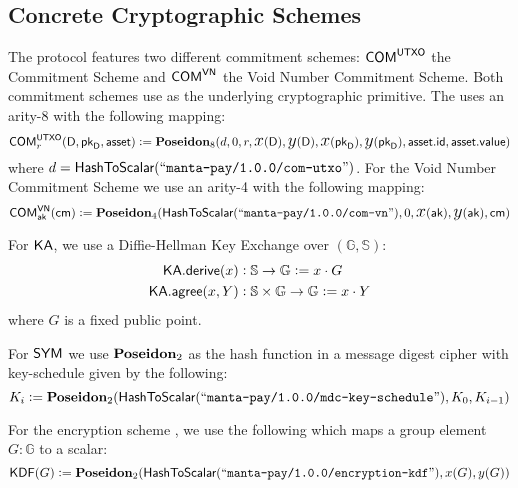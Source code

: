 \subsection{Concrete Cryptographic Schemes}

\begin{definition}
    The protocol features two different commitment schemes: ${\textsf{COM}}^{{\textsf{UTXO}}}$ the \UTXO{} Commitment Scheme and ${\textsf{COM}}^{{\textsf{VN}}}$ the Void Number Commitment Scheme. Both commitment schemes use \Poseidon{} as the underlying cryptographic primitive. The \UTXO{} uses an arity-8 \Poseidon{} with the following mapping:
    \[{\textsf{COM}}^{{\textsf{UTXO}}}_r(\textsf{D}, {{\textsf{pk}}_\textsf{D}}, {\textsf{asset}}) := {\textbf{Poseidon}}_8(d, 0, r, {\text{\Large $x$}}(\textsf{D}), {\text{\Large $y$}}(\textsf{D}), {\text{\Large $x$}}({{\textsf{pk}}_\textsf{D}}), {\text{\Large $y$}}({{\textsf{pk}}_\textsf{D}}), {\textsf{asset}}.{\textsf{id}}, {\textsf{asset}}.{\textsf{value}})\]
    where $d = {\textsf{HashToScalar}}({``\texttt{manta-pay/1.0.0/com-utxo}"})$.
    For the Void Number Commitment Scheme we use an arity-4 \Poseidon{} with the following mapping:
    \[{\textsf{COM}}^{{\textsf{VN}}}_{\textsf{ak}}({\textsf{cm}}) := {\textbf{Poseidon}}_4({\textsf{HashToScalar}}({``\texttt{manta-pay/1.0.0/com-vn}"}), 0, {\text{\Large $x$}}({\textsf{ak}}), {\text{\Large $y$}}({\textsf{ak}}), {\textsf{cm}})\]
\end{definition}

\begin{definition}
    For ${\textsf{KA}}$, we use a Diffie-Hellman Key Exchange over $(\mathbb{G}, \mathbb{S})$:
    \begin{align*}
        {\textsf{KA}}.{\textsf{derive}}(x)   &: \mathbb{S} \to \mathbb{G}                   := x \cdot G \\
        {\textsf{KA}}.{\textsf{agree}}(x, Y) &: \mathbb{S} \times \mathbb{G} \to \mathbb{G} := x \cdot Y
    \end{align*}
    where $G$ is a fixed public point.
\end{definition}

\begin{definition}
    For ${\textsf{SYM}}$ we use ${\textbf{Poseidon}}_2$ as the hash function in a message digest cipher with key-schedule given by the following:
    \[K_i := {\textbf{Poseidon}}_2({\textsf{HashToScalar}}({``\texttt{manta-pay/1.0.0/mdc-key-schedule}"}), K_0, K_{i-1})\]
\end{definition}

\begin{definition}
    For the encryption scheme , we use the following which maps a group element $G : \mathbb{G}$ to a scalar:
    \[{\textsf{KDF}}(G) := {\textbf{Poseidon}}_2({\textsf{HashToScalar}}({``\texttt{manta-pay/1.0.0/encryption-kdf}"}), x(G), y(G))\]
\end{definition}

